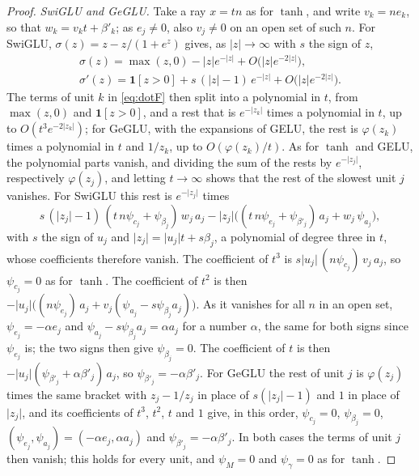 \documentclass[10pt]{article}
\theoremstyle{definition}
\theoremstyle{remark}
\newenvironment{nested}{\par\nopagebreak\def\FrameCommand{\hspace{0.5em}{\color{black!30}\vrule width 0.6pt}\hspace{1em}}\MakeFramed{\advance\hsize-\width\FrameRestore}}{\endMakeFramed}
\begin{document}
\begin{nested}
\begin{proof}
\emph{SwiGLU and GeGLU.} Take a ray $x = tn$ as for $\tanh$, and write $v_k = ne_k$, so that $w_k = v_kt + \beta'_k$; as $e_j \neq 0$, also $v_j \neq 0$ on an open set of such $n$. For SwiGLU, $\sigma(z) = z - z/(1 + e^z)$ gives, as $\lvert z\rvert \to \infty$ with $s$ the sign of $z$,
\begin{gather*}
\sigma(z) = \max(z, 0) - \lvert z\rvert e^{-\lvert z\rvert} + O\big(\lvert z\rvert e^{-2\lvert z\rvert}\big),\\
\sigma'(z) = \mathbf 1[z > 0] + s\,(\lvert z\rvert - 1)\,e^{-\lvert z\rvert} + O\big(\lvert z\rvert e^{-2\lvert z\rvert}\big).
\end{gather*}
The terms of unit $k$ in \cref{eq:dotF} then split into a polynomial in $t$, from $\max(z, 0)$ and $\mathbf 1[z > 0]$, and a rest that is $e^{-\lvert z_k\rvert}$ times a polynomial in $t$, up to $O(t^3e^{-2\lvert z_k\rvert})$; for GeGLU, with the expansions of GELU, the rest is $\varphi(z_k)$ times a polynomial in $t$ and $1/z_k$, up to $O(\varphi(z_k)/t)$. As for $\tanh$ and GELU, the polynomial parts vanish, and dividing the sum of the rests by $e^{-\lvert z_j\rvert}$, respectively $\varphi(z_j)$, and letting $t \to \infty$ shows that the rest of the slowest unit $j$ vanishes. For SwiGLU this rest is $e^{-\lvert z_j\rvert}$ times
\[
s\,(\lvert z_j\rvert - 1)\,(t\,n\psi_{c_j} + \psi_{\beta_j})\,w_j\,a_j - \lvert z_j\rvert\big((t\,n\psi_{e_j} + \psi_{\beta'_j})\,a_j + w_j\,\psi_{a_j}\big),
\]
with $s$ the sign of $u_j$ and $\lvert z_j\rvert = \lvert u_j\rvert t + s\beta_j$, a polynomial of degree three in $t$, whose coefficients therefore vanish. The coefficient of $t^3$ is $s\lvert u_j\rvert\,(n\psi_{c_j})\,v_j\,a_j$, so $\psi_{c_j} = 0$ as for $\tanh$. The coefficient of $t^2$ is then $-\lvert u_j\rvert\big((n\psi_{e_j})\,a_j + v_j(\psi_{a_j} - s\psi_{\beta_j}a_j)\big)$. As it vanishes for all $n$ in an open set, $\psi_{e_j} = -\alpha e_j$ and $\psi_{a_j} - s\psi_{\beta_j}a_j = \alpha a_j$ for a number $\alpha$, the same for both signs since $\psi_{e_j}$ is; the two signs then give $\psi_{\beta_j} = 0$. The coefficient of $t$ is then $-\lvert u_j\rvert(\psi_{\beta'_j} + \alpha\beta'_j)\,a_j$, so $\psi_{\beta'_j} = -\alpha\beta'_j$. For GeGLU the rest of unit $j$ is $\varphi(z_j)$ times the same bracket with $z_j - 1/z_j$ in place of $s(\lvert z_j\rvert - 1)$ and $1$ in place of $\lvert z_j\rvert$, and its coefficients of $t^3$, $t^2$, $t$ and $1$ give, in this order, $\psi_{c_j} = 0$, $\psi_{\beta_j} = 0$, $(\psi_{e_j}, \psi_{a_j}) = (-\alpha e_j, \alpha a_j)$ and $\psi_{\beta'_j} = -\alpha\beta'_j$. In both cases the terms of unit $j$ then vanish; this holds for every unit, and $\psi_M = 0$ and $\psi_\gamma = 0$ as for $\tanh$.
\end{proof}
\end{nested}
\end{document}
